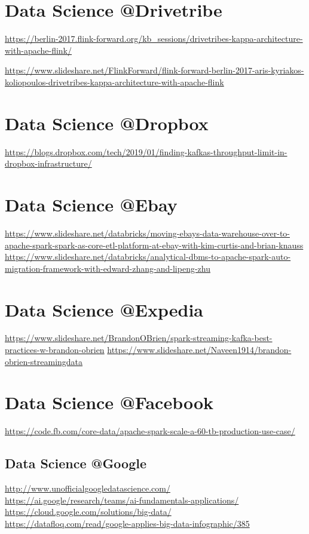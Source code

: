 \documentclass[12pt, numbers=noenddot]{scrreprt} %
\begin{document}
\section{Data Science @Drivetribe}
\url{https://berlin-2017.flink-forward.org/kb_sessions/drivetribes-kappa-architecture-with-apache-flink/}

\url{https://www.slideshare.net/FlinkForward/flink-forward-berlin-2017-aris-kyriakos-koliopoulos-drivetribes-kappa-architecture-with-apache-flink}

\section{Data Science @Dropbox}
\url{https://blogs.dropbox.com/tech/2019/01/finding-kafkas-throughput-limit-in-dropbox-infrastructure/}

\section{Data Science @Ebay}
\url{https://www.slideshare.net/databricks/moving-ebays-data-warehouse-over-to-apache-spark-spark-as-core-etl-platform-at-ebay-with-kim-curtis-and-brian-knauss}
\url{https://www.slideshare.net/databricks/analytical-dbms-to-apache-spark-auto-migration-framework-with-edward-zhang-and-lipeng-zhu}

\section{Data Science @Expedia}
\url{https://www.slideshare.net/BrandonOBrien/spark-streaming-kafka-best-practices-w-brandon-obrien}
\url{https://www.slideshare.net/Naveen1914/brandon-obrien-streamingdata}

\section{Data Science @Facebook}
\url{https://code.fb.com/core-data/apache-spark-scale-a-60-tb-production-use-case/}

\subsection{Data Science @Google}		
\url{http://www.unofficialgoogledatascience.com/} \\		
\url{https://ai.google/research/teams/ai-fundamentals-applications/} \\		
\url{https://cloud.google.com/solutions/big-data/} \\		
\url{https://datafloq.com/read/google-applies-big-data-infographic/385}
\end{document}
